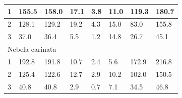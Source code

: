 \documentclass[12pt, a4paper]{article}
\begin{document}
\begin{table}[h]
{\begin{tabular}{|llllllll|}
\multicolumn{1}{|l|}{1}                                         & \multicolumn{1}{l|}{155.5}                       & \multicolumn{1}{l|}{158.0}        & \multicolumn{1}{l|}{17.1}                        & \multicolumn{1}{l|}{3.8}                 & \multicolumn{1}{l|}{11.0}                     & \multicolumn{1}{l|}{119.3}        & 180.7                              \\ \hline
\multicolumn{1}{|l|}{2}                                         & \multicolumn{1}{l|}{128.1}                       & \multicolumn{1}{l|}{129.2}        & \multicolumn{1}{l|}{19.2}                        & \multicolumn{1}{l|}{4.3}                 & \multicolumn{1}{l|}{15.0}                     & \multicolumn{1}{l|}{83.0}         & 155.8                              \\ \hline
\multicolumn{1}{|l|}{3}                                         & \multicolumn{1}{l|}{37.0}                        & \multicolumn{1}{l|}{36.4}         & \multicolumn{1}{l|}{5.5}                         & \multicolumn{1}{l|}{1.2}                 & \multicolumn{1}{l|}{14.8}                     & \multicolumn{1}{l|}{26.7}         & 45.1                               \\ \hline
\multicolumn{8}{|l|}{Nebela carinata}                                                                                                                                                                                                                                                                                                                                         \\ \hline
\multicolumn{1}{|l|}{1}                                         & \multicolumn{1}{l|}{192.8}                       & \multicolumn{1}{l|}{191.8}        & \multicolumn{1}{l|}{10.7}                        & \multicolumn{1}{l|}{2.4}                 & \multicolumn{1}{l|}{5.6}                      & \multicolumn{1}{l|}{172.9}        & 216.8                              \\ \hline
\multicolumn{1}{|l|}{2}                                         & \multicolumn{1}{l|}{125.4}                       & \multicolumn{1}{l|}{122.6}        & \multicolumn{1}{l|}{12.7}                        & \multicolumn{1}{l|}{2.9}                 & \multicolumn{1}{l|}{10.2}                     & \multicolumn{1}{l|}{102.0}        & 150.5                              \\ \hline
\multicolumn{1}{|l|}{3}                                         & \multicolumn{1}{l|}{40.8}                        & \multicolumn{1}{l|}{40.8}         & \multicolumn{1}{l|}{2.9}                         & \multicolumn{1}{l|}{0.7}                 & \multicolumn{1}{l|}{7.1}                      & \multicolumn{1}{l|}{34.5}         & 46.8                               \\ \hline

\end{tabular}}
\end{table}
\end{document}
